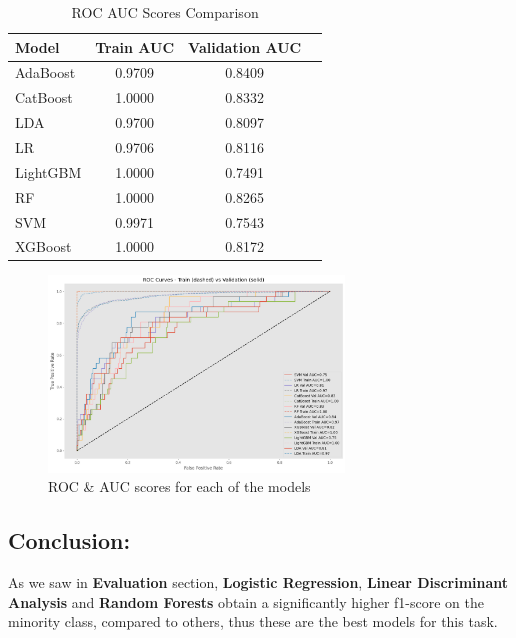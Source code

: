 \documentclass[a4paper,12pt]{article}
\begin{document}
\begin{table}[h]
\centering
\caption{ROC AUC Scores Comparison}
\label{tab:auc_scores}
\begin{tabular}{lSS[table-format=1.4]S[table-format=1.4]}
\toprule
\textbf{Model} & \textbf{Train AUC} & \textbf{Validation AUC} \\
\midrule
AdaBoost  & 0.9709 & 0.8409 \\
CatBoost  & 1.0000 & 0.8332 \\
LDA       & 0.9700 & 0.8097 \\
LR        & 0.9706 & 0.8116 \\
LightGBM  & 1.0000 & 0.7491 \\
RF        & 1.0000 & 0.8265 \\
SVM       & 0.9971 & 0.7543 \\
XGBoost   & 1.0000 & 0.8172 \\
\bottomrule
\end{tabular}
\end{table}

\begin{figure}[H]
    \centering
    \includegraphics[width=0.7\textwidth]{./images/ROC_AUC_eval.png}
    \caption{ROC \& AUC scores for each of the models}
    \label{fig:fig_4}
\end{figure}

\subsection{Conclusion:}
As we saw in \textbf{Evaluation} section, \textbf{Logistic Regression}, \textbf{Linear Discriminant Analysis} and \textbf{Random Forests} obtain a significantly higher f1-score on the minority class,
compared to others, thus these are the best models for this task.
\end{document}
